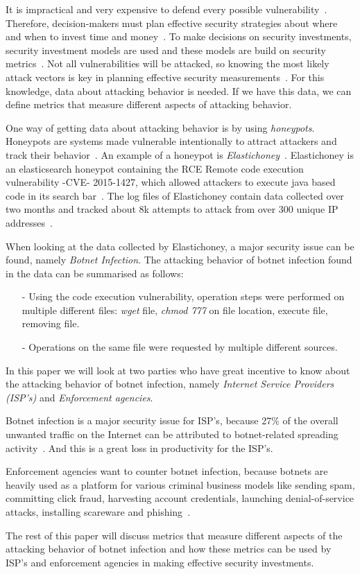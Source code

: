 \label{cap:sec1}

It is impractical and very expensive to defend every possible vulnerability~\cite{TARA}. Therefore, decision-makers must plan effective security strategies about where and when to invest time and money~\cite{ROSI}. To make decisions on security investments, security investment models are used and these models are build on security metrics~\cite{BR2010}. Not all vulnerabilities will be attacked, so knowing the most likely attack vectors is key in planning effective security measurements~\cite{TARA}. For this knowledge, data about attacking behavior is needed. If we have this data, we can define metrics that measure different aspects of attacking behavior.

One way of getting data about attacking behavior is by using \textit{honeypots}. Honeypots are systems made vulnerable intentionally to attract attackers and track their behavior~\cite{WP2010}. An example of a honeypot is \textit{Elastichoney}~\cite{BR2010}. Elastichoney is an elasticsearch honeypot containing the RCE Remote code execution vulnerability -CVE- 2015-1427, which allowed attackers to execute java based code in its search bar~\cite{CVE}. The log files of Elastichoney contain data collected over two months and tracked about 8k attempts to attack from over 300 unique IP addresses~\cite{BR2010}.

When looking at the data collected by Elastichoney, a major security issue can be found, namely \textit{Botnet Infection}. The attacking behavior of botnet infection found in the data can be summarised as follows:
\begin{itemize}
\item[-] Using the code execution vulnerability, operation steps were performed on multiple different files: \textit{wget} file, \textit{chmod 777} on file location, execute file, removing file.   
\item[-] Operations on the same file were requested by multiple different sources.
\end{itemize}
In this paper we will look at two parties who have great incentive to know about the attacking behavior of botnet infection, namely \textit{Internet Service Providers (ISP's)} and \textit{Enforcement agencies}.

Botnet infection is a major security issue for ISP's, because 27\% of the overall unwanted traffic on the Internet can be attributed to botnet-related spreading activity~\cite{AM2006}. And this is a great loss in productivity for the ISP's.  

Enforcement agencies want to counter botnet infection, because botnets are heavily used as a platform for various criminal business models like sending spam, committing click fraud, harvesting account credentials, launching denial-of-service attacks, installing scareware and phishing~\cite{AR2013}.

The rest of this paper will discuss metrics that measure different aspects of the attacking behavior of botnet infection and how these metrics can be used by ISP's and enforcement agencies in making effective security investments.

